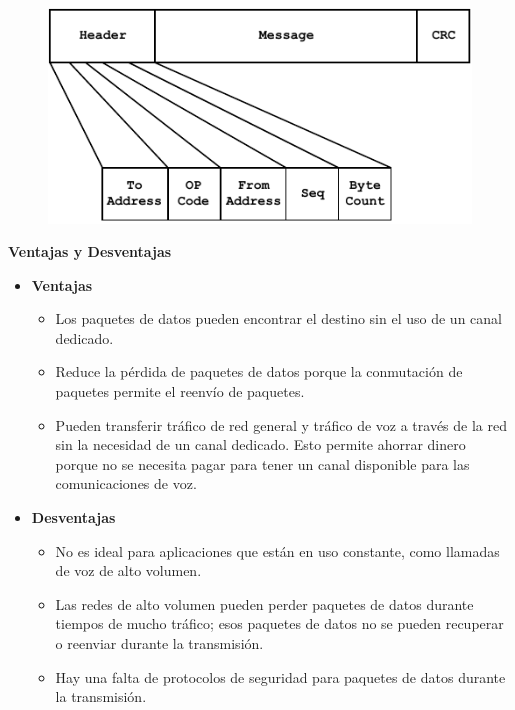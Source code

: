 \begin{itemize}
\begin{itemize}
\begin{figure}[ht!]
\centering
\includegraphics[scale=0.8]{Imagenes/paquete.pdf}
\end{figure}	
		\textbf{Ventajas y Desventajas}
	\begin{itemize}
		\item \textbf{Ventajas}
		\begin{itemize}
		\item Los paquetes de datos pueden encontrar el destino sin el uso de un canal dedicado.
		\item Reduce la pérdida de paquetes de datos porque la conmutación de paquetes permite el reenvío de paquetes.
		\item  Pueden transferir tráfico de red general y tráfico de voz a través de la red sin la necesidad de un canal dedicado. Esto permite ahorrar dinero porque no se necesita pagar para tener un canal disponible para las comunicaciones de voz.
		\end{itemize}
		\item \textbf{Desventajas}
		\begin{itemize}
		\item No es ideal para aplicaciones que están en uso constante, como llamadas de voz de alto volumen.
		\item Las redes de alto volumen pueden perder paquetes de datos durante tiempos de mucho tráfico; esos paquetes de datos no se pueden recuperar o reenviar durante la transmisión.
		\item Hay una falta de protocolos de seguridad para paquetes de datos durante la transmisión.
		\end{itemize}
	\end{itemize}			
		

\end{itemize}
\end{itemize}
